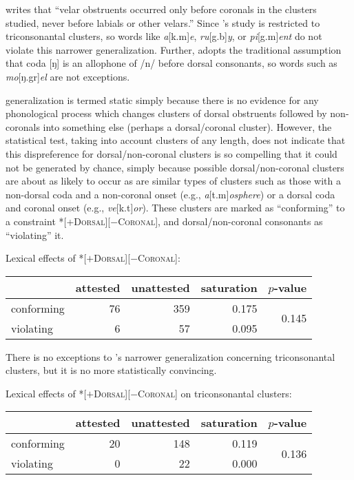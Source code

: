 \citet[][173]{Pierrehumbert1994} writes that ``velar obstruents occurred only before coronals in the clusters studied, never before labials or other velars.'' Since \citeauthor{Pierrehumbert1994}'s study is restricted to triconsonantal clusters, so words like \emph{a}[k.m]\emph{e}, \emph{ru}[g.b]\emph{y}, or \emph{pi}[g.m]\emph{ent} do not violate this narrower generalization. Further, \citeauthor{Pierrehumbert1994} adopts the traditional assumption \citep[e.g.,][66f.]{Borowsky1986} that coda [ŋ] is an allophone of /n/ before dorsal consonants, so words such as \emph{mo}[ŋ.gr]\emph{el} are not exceptions. 

\citeauthor{Pierrehumbert1994} generalization is termed static simply because there is no evidence for any phonological process which changes clusters of dorsal obstruents followed by non-coronals into something else (perhaps a dorsal/coronal cluster). However, the statistical test, taking into account clusters of any length, does not indicate that this dispreference for dorsal/non-coronal clusters is so compelling that it could not be generated by chance, simply because possible dorsal/non-coronal clusters are about as likely to occur as are similar types of clusters such as those with a non-dorsal coda and a non-coronal onset (e.g., \emph{a}[t.m]\emph{osphere}) or a dorsal coda and coronal onset (e.g., \emph{ve}[k.t]\emph{or}). These clusters are marked as ``conforming'' to a constraint \textsc{*[+Dorsal][$-$Coronal]}, and dorsal/non-coronal consonants as ``violating'' it. 

\begin{example}
Lexical effects of \textsc{*[$+$Dorsal][$-$Coronal]}: 

\vspace{0.5\baselineskip}
\begin{tabular}{l r r r r}
\toprule
           & attested & unattested & saturation & $p$-value \\
\midrule
conforming & 76 & 359 & 0.175 & \multirow{2}{*}{0.145} \\
violating  &  6 &  57 & 0.095 \\
\bottomrule
\end{tabular}
\end{example}

There is no exceptions to \citeauthor{Pierrehumbert1994}'s narrower generalization concerning triconsonantal clusters, but it is no more statistically convincing. 

\begin{example}
Lexical effects of \textsc{*[$+$Dorsal][$-$Coronal]} on triconsonantal clusters: 

\vspace{0.5\baselineskip}
\begin{tabular}{l r r r r}
\toprule
           & attested & unattested & saturation & $p$-value \\
\midrule
conforming & 20 & 148 & 0.119 & \multirow{2}{*}{0.136} \\
violating  &  0 &  22 & 0.000 \\
\bottomrule
\end{tabular}
\end{example}

